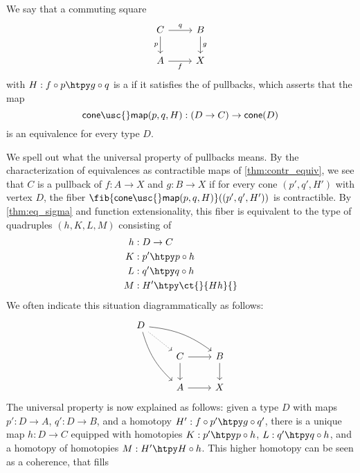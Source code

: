 \begin{defn}
We say that a commuting square
\begin{equation*}
\begin{tikzcd}
C \arrow[r,"q"] \arrow[d,swap,"p"] & B \arrow[d,"g"] \\
A \arrow[r,swap,"f"] & X
\end{tikzcd}
\end{equation*}
with $H:f\circ p\htpy g\circ q$ is a  if it satisfies the  of pullbacks, which asserts that the map
\begin{equation*}
\mathsf{cone\usc{}map}(p,q,H):(D\to C)\to\mathsf{cone}(D)
\end{equation*}
is an equivalence for every type $D$. 
\end{defn}

\begin{rmk}
We spell out what the universal property of pullbacks means. By the characterization of equivalences as contractible maps of \cref{thm:contr_equiv}, we see that $C$ is a pullback of $f:A\to X$ and $g:B\to X$ if for every cone $(p',q',H')$ with vertex $D$, the fiber $\fib{\mathsf{cone\usc{}map}(p,q,H)}((p',q',H'))$ is contractible. By \cref{thm:eq_sigma} and function extensionality, this fiber is equivalent to the type of quadruples $(h,K,L,M)$ consisting of
\begin{align*}
h & : D\to C \\
K & : p' \htpy p\circ h \\
L & : q' \htpy q\circ h \\
M & : H' \htpy \ct{}{Hh}{}
\end{align*}
We often indicate this situation diagrammatically as follows:
\begin{equation*}
\begin{tikzcd}
D \arrow[drr,bend left=15] \arrow[dr,densely dotted] \arrow[ddr,bend right=15] \\
& C \arrow[r] \arrow[d] & B \arrow[d] \\
& A \arrow[r] & X
\end{tikzcd}
\end{equation*}
The universal property is now explained as follows: given a type $D$ with maps $p':D\to A$, $q':D\to B$, and a homotopy $H':f\circ p'\htpy g\circ q'$, there is a unique map $h:D\to C$ equipped with homotopies $K:p'\htpy p\circ h$, $L:q'\htpy q\circ h$, and a homotopy of homotopies $M:H'\htpy H\circ h$. This higher homotopy can be seen as a coherence, that fills
\end{rmk}

